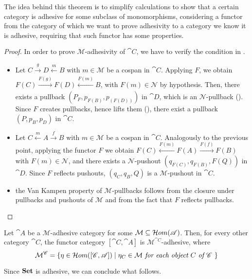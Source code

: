 The idea behind this theorem is to simplify calculations to show that a certain category is adhesive for some subclass of monomorphisms, considering a functor from the category of which we want to prove adhesivity to a category we know it is adhesive, requiring that such functor has some properties.

\begin{proof}
    In order to prove $\mathcal M$-adhesivity of $\cat C$, we have to verify the condition in .
    \begin{itemize}
        \item Let $C \xrightarrow[]{g} D \xleftarrow[]{m} B$ with $m \in \mathcal M$ be a cospan in $\cat C$. Applying $F$, we obtain $F(C) \xrightarrow[]{F(g)} F(D) \xleftarrow[]{F(m)} B$, with $F(m) \in \mathcal{N}$ by hypothesis. Then, there exists a pullback $(P_F, p_{F(B)}, p_{(F(D))})$ in $\cat D$, which is an $\mathcal N$-pullback (). Since $F$ creates pullbacks, hence lifts them (), there exist a pullback $(P, p_B, p_D)$ in $\cat C$.
        \item Let $C \xleftarrow{m} A \xrightarrow{f} B$ with $ m \in \mathcal M$ be a cospan in $\cat C$. Analogously to the previous point, applying the functor $F$ we obtain $F(C) \xleftarrow{F(m)} F(A) \xrightarrow{F(f)} F(B)$ with $ F(m) \in \mathcal N$, and there exists a $\mathcal N$-pushout $(q_{F(C)}, q_{F(B)}, F(Q))$ in $\cat D$. Since $F$ reflects pushouts, $(q_C, q_B, Q)$ is a $\mathcal{M}$-pushout in $\cat C$.
        \item the Van Kampen property of $\mathcal M$-pullbacks follows from the closure under pullbacks and pushouts of $\mathcal M$ and from the fact that $F$ reflects pullbacks.
    \end{itemize}
    
\end{proof}

\begin{cor}\label{cor:adhesivity_functor_categories}
    Let $\cat A$ be a $\mathcal M$-adhesive category for some $\mathcal M \subseteq \mathcal{H}om(\mathscr{A})$. Then, for every other category $\cat C$, the functor category $[\cat C, \cat A]$ is $\mathcal M^{\cat C}$-adhesive, where
    \[
        \mathcal{M}^{\mathscr{C}} = \{\eta \in \mathcal{H}om([\mathscr{C}, \mathscr{A}]) \mid \eta_C \in \mathcal M \textit{ for each object $C$ of $\mathscr{C}$ }\}
    \]
\end{cor}

Since $\mathbf{Set}$ is adhesive, we can conclude what follows.

